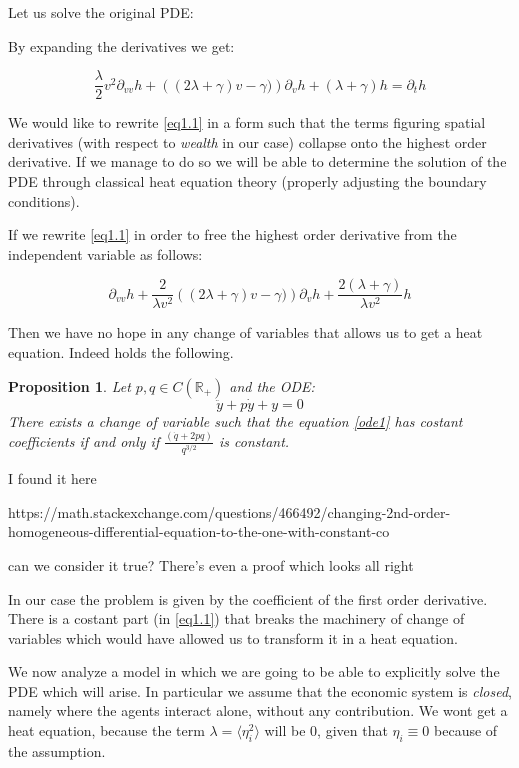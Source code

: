 \documentclass[12pt,a4paper]{article}
\numberwithin{theorem}{section}
\newtheorem*{theorem*}{Proposition}
\numberwithin{definition}{section}
\numberwithin{example}{section}
\numberwithin{exercise}{section}
\newcommand{\R}{\mathbb{R}}
\begin{document}
Let us solve the original PDE:


By expanding the derivatives we get:

\begin{equation}\label{eq1.1}
    \frac{\lambda}{2}v^2\partial_{vv}h+\left((2\lambda+\gamma)v-\gamma)\right)\partial_vh+(\lambda+\gamma)h=\partial_t h
\end{equation}

We would like to rewrite \ref{eq1.1} in a form such that the terms figuring spatial derivatives (with respect to \textit{wealth} in our case) collapse onto the highest order derivative. If we manage to do so we will be able to determine the solution of the PDE through classical heat equation theory (properly adjusting the boundary conditions).

If we rewrite \ref{eq1.1} in order to free the highest order derivative from the independent variable as follows:

\[\partial_{vv}h+\frac{2}{\lambda v^2}\left((2\lambda+\gamma)v-\gamma)\right)\partial_vh+\frac{2(\lambda+\gamma)}{\lambda v^2}h\]

Then we have no hope in any change of variables that allows us to get a heat equation. Indeed holds the following.

\begin{theorem*}
Let $p,q\in C(\R_+)$ and the ODE:
\begin{equation}\label{ode1}\ddot{y}+p\dot{y}+y=0\end{equation}
There exists a change of variable such that the equation \ref{ode1} has costant coefficients if and only if $\frac{(\dot{q}+2pq)}{q^{3/2}}$ is constant.
\end{theorem*}

I found it here
\begin{center}
https://math.stackexchange.com/questions/466492/changing-2nd-order-homogeneous-differential-equation-to-the-one-with-constant-co
\end{center}
can we consider it true? There's even a proof which looks all right

\hspace{5px}

In our case the problem is given by the coefficient of the first order derivative. There is a costant part (in \ref{eq1.1}) that breaks the machinery of change of variables which would have allowed us to transform it in a heat equation.

We now analyze a model in which we are going to be able to explicitly solve the PDE which will arise. In particular we assume that the economic system is \textit{closed}, namely where the agents interact alone, without any contribution. We wont get a heat equation, because the term $\lambda=\langle\eta_i^2\rangle$ will be $0$, given that $\eta_i\equiv0$ because of the assumption. 
\end{document}
